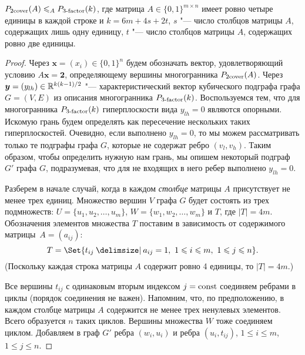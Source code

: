 \begin{theorem}
$P_{\textup{2cover}}(A) \leqslant_A P_{\textup{3-factor}}(k)$, где	
матрица $A \in \{0,1\}^{m\times n}$ имеет ровно четыре единицы в каждой строке и
$k = 6m+4s+2t$, $s$ "--- число столбцов матрицы $A$, содержащих лишь одну единицу, $t$ "--- число столбцов матрицы $A$, содержащих ровно две единицы.
\end{theorem}
\begin{proof}
Через $\bm{x}=(x_i)\in\{0,1\}^n$ будем обозначать вектор, удовлетворяющий условию $A\bm{x}=\bm{2}$, определяющему вершины многогранника $P_{\textup{2cover}}(A)$.
Через $\bm{y}=(y_{lh})\in\mathbb{R}^{k(k-1)/2}$ "--- характеристический вектор кубического подграфа графа $G=(V, E)$ из описания многогранника $P_{\textup{3-factor}}(k)$.
Воспользуемся тем, что для многогранника $P_{\textup{3-factor}}(k)$ гиперплоскости вида $y_{lh}=0$	%
являются опорными.
Искомую грань будем определять как пересечение нескольких таких гиперплоскостей.
Очевидно, если выполнено $y_{lh}=0$, то мы можем рассматривать только те подграфы графа $G$, которые не содержат ребро $(v_l, v_h)$.
Таким образом, чтобы определить нужную нам грань, мы опишем некоторый подграф $G'$ графа $G$, подразумевая, что для не входящих в него ребер выполнено $y_{lh}=0$.
	
Разберем в начале случай, когда в каждом \emph{столбце} матрицы $A$ присутствует не менее трех единиц.
Множество вершин $V$ графа $G$ будет состоять из трех подмножеств:
$U = \{u_1, u_2, \ldots, u_m\}$, $W = \{w_1, w_2, \ldots, w_m\}$ и $T$, где $|T| = 4m$.
Обозначения элементов множества $T$ поставим в зависимость от содержимого матрицы~$A = (a_{ij})$:
\[
T=\Set{t_{ij} \given a_{ij}=1, \ 1\le i \le m, \ 1\le j \le n}.
\]
(Поскольку каждая строка матрицы $A$ содержит ровно 4 единицы, то $|T| = 4m$.)


Все вершины $t_{ij}$ с одинаковым вторым индексом $j=\operatorname{const}$ соединяем ребрами в циклы (порядок соединения не важен).
Напомним, что, по предположению, в каждом столбце матрицы $A$ содержится не менее трех ненулевых элементов.
Всего образуется $n$ таких циклов.
Вершины множества $W$ тоже соединяем циклом.
Добавляем в граф $G'$ ребра $(w_i, u_i)$ и ребра $(u_i, t_{ij})$,
$1\le i \le m$, $1\le j \le n$.
	

\end{proof}
